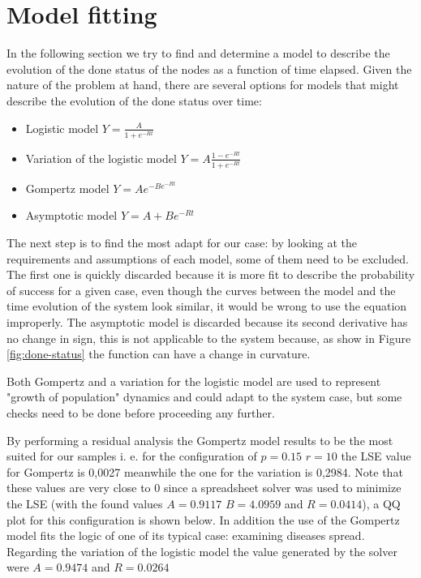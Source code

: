 \section{Model fitting} \label{sec:ModelFitting}
In the following section we try to find and determine a model to describe the evolution of the done status of the nodes as a function of time elapsed. Given the nature of the problem at hand, there are several options for models that might describe the evolution of the done status over time:

\begin{itemize}
	\item Logistic model $ Y = \frac{A}{1 + e^{-Rt}} $
	\item Variation of the logistic model $ Y = A\frac{1-e^{-Rt}}{1+e^{-Rt}}$
	\item Gompertz model $ Y = Ae^{-Be^{-Rt}} $
	
	\item Asymptotic model $ Y = A + Be^{-Rt}$
\end{itemize} 

The next step is to find the most adapt for our case: by looking at the requirements and assumptions of each model, some of them need to be excluded. The first one is quickly discarded because it is more fit to describe the probability of success for a given case, even though the curves between the model and the time evolution of the system look similar, it would be wrong to use the equation improperly.
The asymptotic model is discarded because its second derivative has no change in sign, this is not applicable to the system because, as show in Figure \ref{fig:done-status} the function can have a change in curvature.


Both Gompertz and a variation for the logistic model are used to represent "growth of population" dynamics and could adapt to the system case, but some checks need to be done before proceeding any further.

By performing a residual analysis the Gompertz model results to be the most suited for our samples i. e. for the configuration of $p=0.15$  $r=10$ the LSE value for Gompertz is 0,0027 meanwhile the one for the variation is 0,2984. Note that these values are very close to 0 since a spreadsheet solver was used to minimize the LSE (with the found values $A=0.9117$ $B=4.0959$ and $R=0.0414$), a QQ plot for this configuration is shown below. In addition the use of the Gompertz model fits the logic of one of its typical case: examining diseases spread. Regarding the variation of the logistic model the value generated by the solver were $A=0.9474$ and $R=0.0264$


